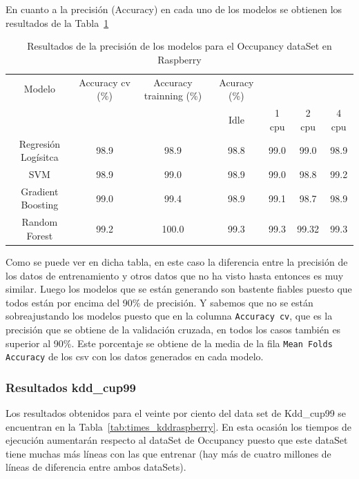 \documentclass[a4paper, 12pt]{book}
\begin{document}
En cuanto a la precisión (Accuracy) en cada uno de los modelos se obtienen los resultados de la Tabla~\ref{tab:acc_Occraspberry}

\begin{table}[]
\begin{adjustbox}{width=\textwidth}
\centering
    \begin{tabular}{c  c  c  c  c  c  c}
    \hline
    Modelo & Accuracy cv (\%) & Accuracy trainning (\%) & Acuracy (\%) & & & \\
    \cline{4-7}
     &   &   &  Idle & 1 cpu & 2 cpu & 4 cpu \\
     \hline
     Regresión Logísitca & 98.9 & 98.9 & 98.8 & 99.0 & 99.0 & 98.9\\
     SVM & 98.9 & 99.0 & 98.9 & 99.0 & 98.8 & 99.2\\
     Gradient Boosting & 99.0 & 99.4 & 98.9 & 99.1 & 98.7 & 98.9\\
     Random Forest & 99.2 & 100.0 & 99.3 & 99.3 & 99.32 & 99.3\\
    \hline
    \end{tabular}
\end{adjustbox}
\caption{Resultados de la precisión de los modelos para el Occupancy dataSet en Raspberry}
\label{tab:acc_Occraspberry}
\end{table}

Como se puede ver en dicha tabla, en este caso la diferencia entre la precisión de los datos de entrenamiento y otros datos que no ha visto hasta entonces es muy similar. Luego los modelos que se están generando son bastente fiables puesto que todos están por encima del 90\% de precisión. Y sabemos que no se están sobreajustando los modelos puesto que en la columna \texttt{Accuracy cv}, que es la precisión que se obtiene de la validación cruzada, en todos los casos también es superior al 90\%. Este porcentaje se obtiene de la media de la fila \texttt{Mean Folds Accuracy} de los csv con los datos generados en cada modelo.

\subsubsection{Resultados kdd\_cup99}
\label{subsubsec:kdd_raspberry}

Los resultados obtenidos para el veinte por ciento del data set de Kdd\_cup99 se encuentran en la Tabla~\ref{tab:times_kddraspberry}. En esta ocasión los tiempos de ejecución aumentarán respecto al dataSet de Occupancy puesto que este dataSet tiene muchas más líneas con las que entrenar (hay más de cuatro millones de líneas de diferencia entre ambos dataSets).
\end{document}
